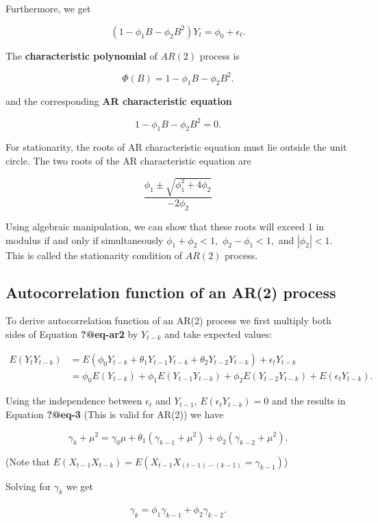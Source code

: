 \documentclass[
  11pt,
  a4paper,
]{report}
\begin{document}
Furthermore, we get

\[(1-\phi_1 B - \phi_2 B^2) Y_t = \phi_0 + \epsilon_t.\]

The \textbf{characteristic polynomial} of \(AR(2)\) process is

\[\Phi(B)=1-\phi_1 B - \phi_2 B^2.\]

and the corresponding \textbf{AR characteristic equation}

\[1-\phi_1 B - \phi_2 B^2=0.\]

For stationarity, the roots of AR characteristic equation must lie
outside the unit circle. The two roots of the AR characteristic equation
are

\[\frac{\phi_1 \pm \sqrt{\phi_1^2 + 4\phi_2}}{-2\phi_2}\]

Using algebraic manipulation, we can show that these roots will exceed 1
in modulus if and only if simultaneously \(\phi_1 + \phi_2 < 1,\)
\(\phi_2-\phi_1 < 1,\) and \(|\phi_2| < 1.\) This is called the
stationarity condition of \(AR(2)\) process.

\subsection{Autocorrelation function of an AR(2)
process}\label{autocorrelation-function-of-an-ar2-process}

To derive autocorrelation function of an AR(2) process we first multiply
both sides of Equation \textbf{?@eq-ar2} by \(Y_{t-k}\) and take
expected values:

\begin{align}
E(Y_tY_{t-k}) &= E(\phi_0Y_{t-k}+\theta_1Y_{t-1}Y_{t-k}+\theta_2Y_{t-2}Y_{t-k})+\epsilon_tY_{t-k} \\
&= \phi_0 E(Y_{t-k})+\phi_{1}E(Y_{t-1}Y_{t-k}) + \phi_2 E(Y_{t-2} Y_{t-k}) + E(\epsilon_tY_{t-k}).
\end{align}

Using the independence between \(\epsilon_t\) and \(Y_{t-1}\),
\(E(\epsilon_t Y_{t-k})=0\) and the results in Equation \textbf{?@eq-3}
(This is valid for AR(2)) we have

\[\gamma_k + \mu^2 = \gamma_0 \mu + \theta_1 (\gamma_{k-1}+\mu^2)+\phi_2 (\gamma_{k-2}+\mu^2).\]

(Note that \(E(X_{t-1}X_{t-k})=E(X_{t-1}X_{(t-1)-(k-1)}=\gamma_{k-1})\))

Solving for \(\gamma_k\) we get

\begin{align}
 \gamma_k=\phi_1\gamma_{k-1}+\phi_2\gamma_{k-2}.
\end{align}
\end{document}
